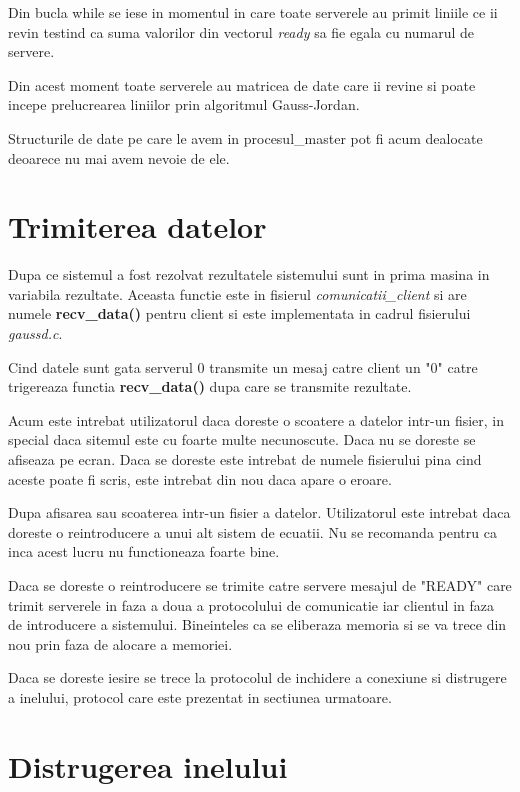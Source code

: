 Din bucla while se iese in momentul in care toate serverele au primit liniile 
ce ii revin testind ca suma valorilor din vectorul {\it ready} sa fie egala
cu numarul de servere.

Din acest moment toate serverele au matricea de date care ii revine si poate
incepe prelucrearea liniilor prin algoritmul Gauss-Jordan.

Structurile de date pe care le avem in procesul\_master pot fi acum
dealocate deoarece nu mai avem nevoie de ele.
\section{Trimiterea datelor}

\hspace{5mm}Dupa ce sistemul a fost rezolvat rezultatele sistemului sunt in
prima masina in variabila rezultate. Aceasta functie este in fisierul
{\it comunicatii\_client} si are numele {\bf recv\_data()} pentru client si
este implementata in cadrul fisierului {\it gaussd.c}.

Cind datele sunt gata serverul 0 transmite un mesaj catre client un "0"
catre trigereaza functia {\bf recv\_data()} dupa care se transmite
rezultate.

Acum este intrebat utilizatorul daca doreste o scoatere a datelor intr-un
fisier, in special daca sitemul este cu foarte multe necunoscute. Daca nu se
 doreste se afiseaza pe ecran. Daca se doreste este intrebat de numele
fisierului pina cind aceste poate fi scris, este intrebat din nou daca apare
o eroare.

Dupa afisarea sau scoaterea intr-un fisier a datelor. Utilizatorul este
intrebat daca doreste o reintroducere a unui alt sistem de ecuatii. Nu se
recomanda pentru ca inca acest lucru nu functioneaza foarte bine.

Daca se doreste o reintroducere se trimite catre servere mesajul de "READY"
care trimit serverele in faza a doua a protocolului de comunicatie iar
clientul in faza de introducere a sistemului. Bineinteles ca se eliberaza
memoria si se va trece din nou prin faza de alocare a memoriei.

Daca se doreste iesire se trece la protocolul de inchidere a conexiune si
distrugere a inelului, protocol care este prezentat in sectiunea urmatoare.

\section{Distrugerea inelului}

